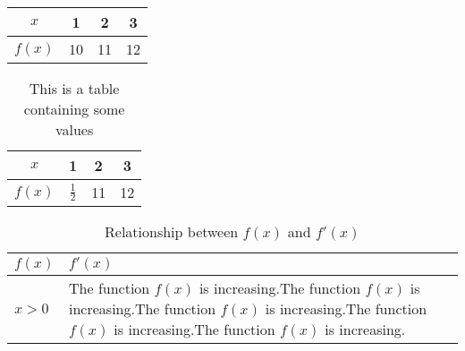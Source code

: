 \documentclass{article}
\begin{document}
\begin{tabular}{|c||c|c|c|}
\hline
$x$ & 1 & 2 & 3\\
\hline
$f(x)$ & 10 & 11 & 12\\
\hline
\end{tabular}

\begin{table}[H]
\centering
\renewcommand{\arraystretch}{1.5}
\begin{tabular}{|c||c|c|c|}
\hline
$x$ & 1 & 2 & 3\\
\hline
$f(x)$ & $\frac{1}{2}$ & 11 & 12\\
\hline
\end{tabular}
\caption{This is a table containing some values}
\end{table}

\begin{table}[H]
\centering
\renewcommand{\arraystretch}{1.5}
\begin{tabular}{|l|p{3in}|}
\hline
$f(x)$ & $f'(x)$\\
\hline
$x>0$ & The function $f(x)$ is increasing.The function $f(x)$ is increasing.The function $f(x)$ is increasing.The function $f(x)$ is increasing.The function $f(x)$ is increasing.\\
\hline
\end{tabular}
\caption{Relationship between $f(x)$ and $f'(x)$}
\end{table}
\end{document}
